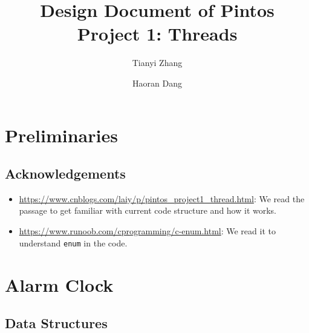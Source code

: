 \documentclass[sigconf, nonacm]{acmart}
\begin{document}
    \title{Design Document of Pintos \\ Project 1: Threads}

    \author{Tianyi Zhang}
    \author{Haoran Dang}

    \maketitle

    \section*{Preliminaries}

        \subsection*{Acknowledgements}

            \begin{itemize}
                \item \url{https://www.cnblogs.com/laiy/p/pintos_project1_thread.html}: We read the passage to get familiar with current code structure and how it works. 
                \item \url{https://www.runoob.com/cprogramming/c-enum.html}: We read it to understand \texttt{enum} in the code. 
            \end{itemize} 
    
    \section{Alarm Clock}
    
        \subsection{Data Structures}
        
\end{document}
